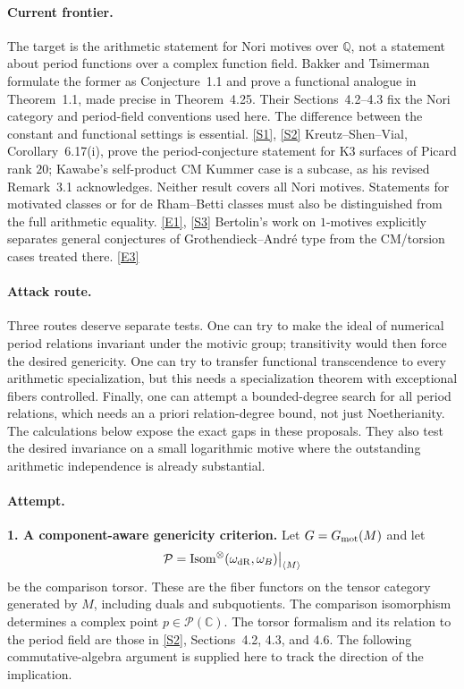 \documentclass[11pt,a4paper]{article}
\newcommand{\Q}{\mathbb{Q}}
\newcommand{\C}{\mathbb{C}}
\newcommand{\sref}[2]{\hyperlink{source:#1:#2}{[S#2]}}
\newcommand{\eref}[2]{\hyperlink{extra:#1:#2}{[E#2]}}
\numberwithin{equation}{section}
\begin{document}
\paragraph{Current frontier.}
The target is the arithmetic statement for Nori motives over $\Q$, not a
statement about period functions over a complex function field. Bakker and
Tsimerman formulate the former as Conjecture~1.1 and prove a functional
analogue in Theorem~1.1, made precise in Theorem~4.25. Their
Sections~4.2--4.3 fix the Nori category and period-field conventions used
here. The difference between the constant and functional settings is
essential. \sref{statement}{1}, \sref{statement}{2}
Kreutz--Shen--Vial, Corollary~6.17(i), prove the period-conjecture statement
for K3 surfaces of Picard rank $20$; Kawabe's self-product CM Kummer case
is a subcase, as his revised Remark~3.1 acknowledges. Neither result covers
all Nori motives. Statements for motivated classes or for de Rham--Betti
classes must also be distinguished from the full arithmetic equality.
\eref{statement}{1}, \sref{statement}{3}
Bertolin's work on $1$-motives explicitly separates general conjectures
of Grothendieck--Andr\'e type from the CM/torsion cases treated there.
\eref{statement}{3}

\paragraph{Attack route.}
Three routes deserve separate tests. One can try to make the ideal of
numerical period relations invariant under the motivic group; transitivity
would then force the desired genericity. One can try to transfer functional
transcendence to every arithmetic specialization, but this needs a
specialization theorem with exceptional fibers controlled. Finally, one
can attempt a bounded-degree search for all period relations, which needs
an a priori relation-degree bound, not just Noetherianity. The calculations
below expose the exact gaps in these proposals. They also test the desired
invariance on a small logarithmic motive where the outstanding arithmetic
independence is already substantial.

\paragraph{Attempt.}
\textbf{1. A component-aware genericity criterion.}
Let $G=G_{\rm mot}(M)$ and let
\[
 \mathcal P=\operatorname{Isom}^{\otimes}
       (\omega_{\rm dR},\omega_B)\big|_{\langle M\rangle}
\]
be the comparison torsor. These are the fiber functors on the tensor
category generated by $M$, including duals and subquotients. The comparison
isomorphism determines a complex point $p\in\mathcal P(\C)$.
The torsor formalism and its relation to the period field are those in
\sref{statement}{2}, Sections~4.2, 4.3, and 4.6. The following commutative-algebra
argument is supplied here to track the direction of the implication.
\end{document}
